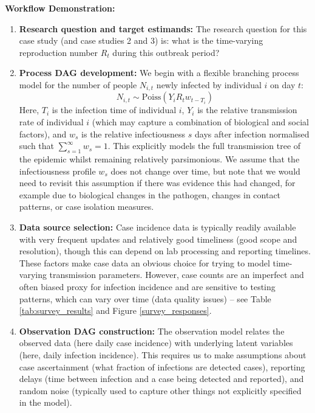 \documentclass{article}
\begin{document}
\textbf{Workflow Demonstration:}
\begin{enumerate}
    \item \textbf{Research question and target estimands:} The research question for this case study (and case studies 2 and 3) is: what is the time-varying reproduction number $R_t$ during this outbreak period?

    \item \textbf{Process DAG development:} We begin with a flexible branching process model for the number of people $N_{i,t}$ newly infected by individual $i$ on day $t$:
    \begin{equation} \label{eq:individual_level}
         N_{i,t} \sim \mathrm{Poiss} \left( Y_i R_t w_{t-T_i} \right)
    \end{equation} 
    Here, $T_i$ is the infection time of individual $i$, $Y_i$ is the relative transmission rate of individual $i$ (which may capture a combination of biological and social factors), and $w_s$ is the relative infectiousness $s$ days after infection normalised such that $\sum_{s=1}^\infty w_s=1$. This explicitly models the full transmission tree of the epidemic whilst remaining relatively parsimonious. We assume that the infectiousness profile $w_s$ does not change over time, but note that we would need to revisit this assumption if there was evidence this had changed, for example due to biological changes in the pathogen, changes in contact patterns, or case isolation measures.
    

\item \textbf{Data source selection:} Case incidence data is typically readily available with very frequent updates and relatively good timeliness (good scope and resolution), though this can depend on lab processing and reporting timelines. These factors make case data an obvious choice for trying to model time-varying transmission parameters. However, case counts are an imperfect and often biased proxy for infection incidence and are sensitive to testing patterns, which can vary over time (data quality issues) -- see Table \ref{tab:survey_results} and Figure \ref{survey_responses}. 


\item \textbf{Observation DAG construction:} The observation model relates the observed data (here daily case incidence) with underlying latent variables (here, daily infection incidence). 
This requires us to make assumptions about case ascertainment (what fraction of infections are detected cases), reporting delays (time between infection and a case being detected and reported), and random noise (typically used to capture other things not explicitly specified in the model).


\end{enumerate}
\end{document}
